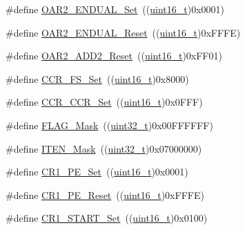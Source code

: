 \begin{DoxyCompactItemize}
\item 
\#define \hyperlink{group___i2_c___private___defines_ga859551657f688e5efdb3f573e78ee979}{O\+A\+R2\+\_\+\+E\+N\+D\+U\+A\+L\+\_\+\+Set}~((\hyperlink{_p_e___types_8h_a1f1825b69244eb3ad2c7165ddc99c956}{uint16\+\_\+t})0x0001)
\item 
\#define \hyperlink{group___i2_c___private___defines_gaae86eb7689c73e34388cfbd03b8d9ecd}{O\+A\+R2\+\_\+\+E\+N\+D\+U\+A\+L\+\_\+\+Reset}~((\hyperlink{_p_e___types_8h_a1f1825b69244eb3ad2c7165ddc99c956}{uint16\+\_\+t})0x\+F\+F\+F\+E)
\item 
\#define \hyperlink{group___i2_c___private___defines_ga243036db699954e290f48e6743323054}{O\+A\+R2\+\_\+\+A\+D\+D2\+\_\+\+Reset}~((\hyperlink{_p_e___types_8h_a1f1825b69244eb3ad2c7165ddc99c956}{uint16\+\_\+t})0x\+F\+F01)
\item 
\#define \hyperlink{group___i2_c___private___defines_ga3af49180596b283514782708ac85606e}{C\+C\+R\+\_\+\+F\+S\+\_\+\+Set}~((\hyperlink{_p_e___types_8h_a1f1825b69244eb3ad2c7165ddc99c956}{uint16\+\_\+t})0x8000)
\item 
\#define \hyperlink{group___i2_c___private___defines_ga07695fd4c06df54def77840118f83a0d}{C\+C\+R\+\_\+\+C\+C\+R\+\_\+\+Set}~((\hyperlink{_p_e___types_8h_a1f1825b69244eb3ad2c7165ddc99c956}{uint16\+\_\+t})0x0\+F\+F\+F)
\item 
\#define \hyperlink{group___i2_c___private___defines_ga2be62bf481cd44de9ab604efe5595ff6}{F\+L\+A\+G\+\_\+\+Mask}~((\hyperlink{_p_e___types_8h_a33594304e786b158f3fb30289278f5af}{uint32\+\_\+t})0x00\+F\+F\+F\+F\+F\+F)
\item 
\#define \hyperlink{group___i2_c___private___defines_gab99e12994e073c2a681a6cf68492b3e2}{I\+T\+E\+N\+\_\+\+Mask}~((\hyperlink{_p_e___types_8h_a33594304e786b158f3fb30289278f5af}{uint32\+\_\+t})0x07000000)
\item 
\#define \hyperlink{group___i2_c___private___defines_ga913b708338087f3ffc2fba2b05a38917}{C\+R1\+\_\+\+P\+E\+\_\+\+Set}~((\hyperlink{_p_e___types_8h_a1f1825b69244eb3ad2c7165ddc99c956}{uint16\+\_\+t})0x0001)
\item 
\#define \hyperlink{group___i2_c___private___defines_ga21dc289f16c502a2bc0a88e1514a8ee0}{C\+R1\+\_\+\+P\+E\+\_\+\+Reset}~((\hyperlink{_p_e___types_8h_a1f1825b69244eb3ad2c7165ddc99c956}{uint16\+\_\+t})0x\+F\+F\+F\+E)
\item 
\#define \hyperlink{group___i2_c___private___defines_ga53820dd338da9779d039718148184ef9}{C\+R1\+\_\+\+S\+T\+A\+R\+T\+\_\+\+Set}~((\hyperlink{_p_e___types_8h_a1f1825b69244eb3ad2c7165ddc99c956}{uint16\+\_\+t})0x0100)

\end{DoxyCompactItemize}
